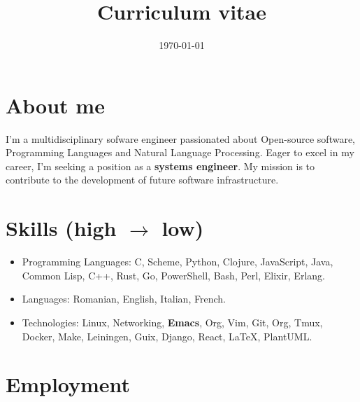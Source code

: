 \documentclass{moderncv}
\date{\today}
\title{Curriculum vitae}
\begin{document}
\maketitle

\section{About me}
\label{sec:org890809f}
I'm a multidisciplinary sofware engineer passionated 
about Open-source software, Programming Languages 
and Natural Language Processing. Eager to excel in 
my career, I'm seeking a position as a 
\textbf{systems engineer}. My mission is to contribute 
to the development of future software infrastructure.

\section{Skills (high \(\rightarrow\) low)}
\label{sec:org58efb62}
\begin{itemize}
\item Programming Languages: C, Scheme, Python, Clojure, 
JavaScript, Java, Common Lisp, C++, Rust, Go, 
PowerShell, Bash, Perl, Elixir, Erlang.
\item Languages: Romanian, English, Italian, French.
\item Technologies: Linux, Networking, \textbf{Emacs}, Org, Vim, 
Git, Org, Tmux, Docker, Make, Leiningen, Guix,  
Django, React, \LaTeX{}, PlantUML.
\end{itemize}
\section{Employment}
\label{sec:org6556249}
\end{document}
